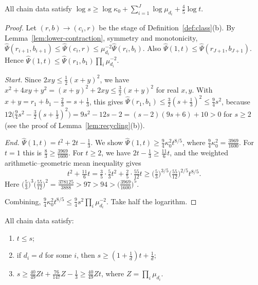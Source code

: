 \begin{lemma}[Endpoints]\label{lem:lower-endpoint}
All chain data satisfy
\(\log s\ge\log\kappa_0+\sum_{i=1}^J\log\mu_{d_i}+\frac45\log t\).
\end{lemma}

\begin{proof}
Let \((r,b)\to(c_i,r)\) be the stage of
Definition~\ref{def:class}(b). By Lemma~\ref{lem:lower-contraction},
symmetry and monotonicity,
\(\hat\Psi(r_{i+1},b_{i+1})\le\hat\Psi(c_i,r)\le\mu_{d_i}^{-2}\hat\Psi(r_i,b_i)\).
Also \(\hat\Psi(1,t)\le\hat\Psi(r_{J+1},b_{J+1})\). Hence
\(\hat\Psi(1,t)\le\hat\Psi(r_1,b_1)\prod_i\mu_{d_i}^{-2}\).

\emph{Start.} Since \(2xy\le\frac12(x+y)^2\), we have
\(x^2+4xy+y^2=(x+y)^2+2xy\le\frac32(x+y)^2\) for real \(x,y\). With \(x+y=r_1+b_1-\frac23=s+\frac13\), this gives
\(\hat\Psi(r_1,b_1)\le\frac32(s+\frac13)^2\le\frac94s^2\), because
\(12\bigl(\frac94s^2-\frac32(s+\frac13)^2\bigr)=9s^2-12s-2=(s-2)(9s+6)+10>0\)
for \(s\ge2\) (see the proof of Lemma~\ref{lem:recycling}(b)).

\emph{End.} \(\hat\Psi(1,t)=t^2+2t-\frac13\). We show
\(\hat\Psi(1,t)\ge\frac94\kappa_0^2t^{8/5}\), where
\(\frac94\kappa_0^2=\frac{3969}{1600}\). For \(t=1\) this is
\(\frac83\ge\frac{3969}{1600}\). For \(t\ge2\), we have
\(2t-\frac13\ge\frac{11}6t\), and the weighted arithmetic--geometric
mean inequality gives
\[
 t^2+\tfrac{11}6t=\tfrac35\cdot\tfrac53t^2+\tfrac25\cdot\tfrac{55}{12}t
 \ge\bigl(\tfrac53\bigr)^{3/5}\bigl(\tfrac{55}{12}\bigr)^{2/5}t^{8/5}.
\]
Here
\(\bigl(\frac53\bigr)^3\bigl(\frac{55}{12}\bigr)^2=\frac{378125}{3888}>97>94>\bigl(\frac{3969}{1600}\bigr)^5\).

Combining, \(\frac94\kappa_0^2t^{8/5}\le\frac94s^2\prod_i\mu_{d_i}^{-2}\).
Take half the logarithm.
\end{proof}

\begin{lemma}\label{lem:source-terminal}
All chain data satisfy:
\begin{enumerate}
\item[(a)] \(t\le s\);
\item[(b)] if \(d_i=d\) for some \(i\), then \(s\ge(1+\frac1d)t+\frac1d\);
\item[(c)] \(s\ge\frac{40}{49}Zt+\frac{76}{147}Z-\frac13\ge\frac{40}{49}Zt\),
where \(Z=\prod_i\mu_{d_i}\).
\end{enumerate}
\end{lemma}

